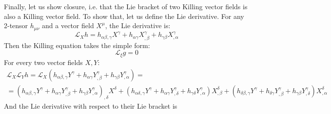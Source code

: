 \documentclass{article}
\begin{document}
Finally, let us show closure, i.e. that the Lie bracket of two Killing vector fields is also a Killing vector field. To show that, let us define the Lie derivative. For any 2-tensor $h_{\mu\nu}$ and a vector field $X^\mu$, the Lie derivative is:
\begin{equation}
    \mathcal{L}_X h = h_{\alpha\beta,\gamma}X^\gamma + h_{\alpha\gamma}X^\gamma_{,\beta} + h_{\gamma\beta}X^\gamma_{,\alpha}
\end{equation}
Then the Killing equation takes the simple form:
\begin{equation}
    \mathcal{L}_\xi g = 0
\end{equation}
For every two vector fields $X, Y$:
\begin{equation}
\begin{gathered}
\label{eq:second_lie_derivative}
    \mathcal{L}_X \mathcal{L}_Y h = \mathcal{L}_X \left(
        h_{\alpha\beta,\gamma}Y^\gamma + h_{\alpha\gamma} Y^\gamma_{,\beta} + h_{\gamma\beta}Y^\gamma_{,\alpha}
    \right) = \\ =
    \left(
        h_{\alpha\beta,\gamma}Y^\gamma + h_{\alpha\gamma} Y^\gamma_{,\beta} + h_{\gamma\beta}Y^\gamma_{,\alpha}
    \right)_{,\delta} X^\delta + \left(h_{\alpha\delta,\gamma}Y^\gamma + h_{\alpha\gamma} Y^\gamma_{,\delta} + h_{\gamma\delta} Y^\gamma_{,\alpha}\right) X^\delta_{,\beta} +
    \left(h_{\delta\beta,\gamma}Y^\gamma + h_{\delta\gamma} Y^\gamma_{,\beta} + h_{\gamma\beta}Y^\gamma_{,\delta}\right) X^\delta_{,\alpha}
\end{gathered}
\end{equation}
And the Lie derivative with respect to their Lie bracket is
\end{document}
